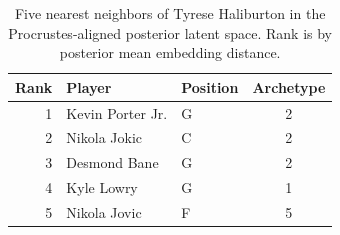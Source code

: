 \begin{table}[htbp]
  \centering\small
  \begin{tabular}{rllc}
    \toprule
    Rank & Player & Position & Archetype \\
    \midrule
    1 & Kevin Porter Jr. & G & 2 \\
    2 & Nikola Jokic & C & 2 \\
    3 & Desmond Bane & G & 2 \\
    4 & Kyle Lowry & G & 1 \\
    5 & Nikola Jovic & F & 5 \\
    \bottomrule
  \end{tabular}
  \caption{Five nearest neighbors of Tyrese Haliburton in the Procrustes-aligned posterior latent space. Rank is by posterior mean embedding distance.}
  \label{tab:Tyrese_Haliburton_neighbors}
\end{table}

